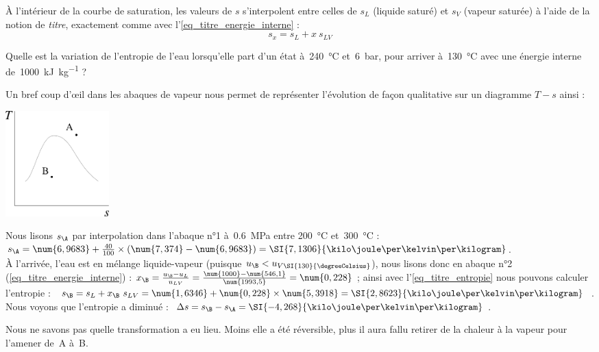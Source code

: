 	
		À l’intérieur de la courbe de saturation, les valeurs de $s$ s’interpolent entre celles de $s_L$ (liquide saturé) et $s_V$ (vapeur saturée) à l’aide de la notion de \emph{titre}, exactement comme avec l’\cref{eq_titre_energie_interne} :
		\begin{equation}
			s_x = s_L + x \ s_{LV}
			\label{eq_titre_entropie}
		\end{equation}
	
		\clearfloats
		\begin{anexample}
			Quelle est la variation de l’entropie de l’eau lorsqu’elle part d’un état à~\SI{240}{\degreeCelsius} et~\SI{6}{\bar}, pour arriver à~\SI{130}{\degreeCelsius} avec une énergie interne de~\SI{1000}{\kilo\joule\per\kilogram} ?%
			
				\begin{answer}
					Un bref coup d’œil dans les abaques de vapeur nous permet de représenter l’évolution de façon qualitative sur un diagramme $T-s$ ainsi :
						\begin{center}\includegraphics[width=4cm]{images/exe_ts_4.png}\end{center}
					Nous lisons $s_\A$ par interpolation dans l’abaque n°1 à~\SI{0,6}{\mega\pascal} entre \SI{200}{\degreeCelsius} et~\SI{300}{\degreeCelsius} : $s_\A= \num{6,9683} + \frac{40}{100}\times(\num{7,374}-\num{6,9683}) = \SI{7,1306}{\kilo\joule\per\kelvin\per\kilogram} $.\\
					À l’arrivée, l’eau est en mélange liquide-vapeur (puisque $u_\B<u_{V\SI{130}{\degreeCelsius}}$), nous lisons donc en abaque n°2 (\ref{eq_titre_energie_interne}) : $x_\B = \frac{u_\B - u_L}{u_{LV}} = \frac{\num{1000}-\num{546,1}}{\num{1993,5}}= \num{0,228} $ ; ainsi avec l’\cref{eq_titre_entropie} nous pouvons calculer l’entropie : $s_\B= s_L + x_\B \ s_{LV} = \num{1,6346}+ \num{0,228}\times\num{5,3918} = \SI{2,8623}{\kilo\joule\per\kelvin\per\kilogram}$.\\
					Nous voyons que l’entropie a diminué : $\Delta s = s_\B - s_\A = \SI{-4,268}{\kilo\joule\per\kelvin\per\kilogram} $.
				
				\begin{remark}Nous ne savons pas quelle transformation a eu lieu. Moins elle a été réversible, plus il aura fallu retirer de la chaleur à la vapeur pour l’amener de~A à~B.\end{remark}\end{answer}
		\end{anexample}

